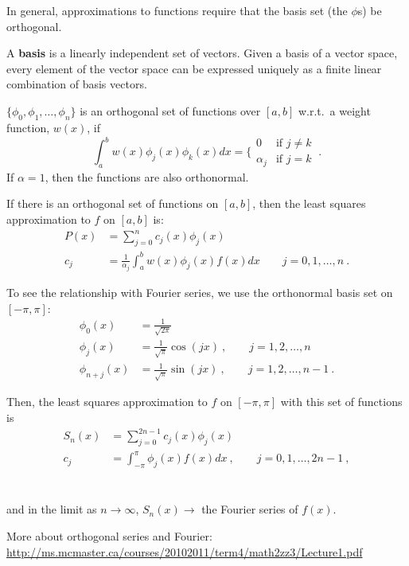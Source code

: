 \documentclass[12pt, answers]{exam}
\begin{document}
In general, approximations to functions require that the basis set (the $\phi$s) be orthogonal. 

A \textbf{basis} is a linearly independent set of vectors. Given a basis of a vector space, every element of the vector space can be expressed uniquely as a finite linear combination of basis vectors.

$\{ \phi_0, \phi_1, \dots, \phi_n\}$ is an orthogonal set of functions over $[a,b]$ w.r.t.\ a weight function, $w(x)$, if
%
\begin{equation}
\int_a^b w(x) \phi_j(x) \phi_k(x) dx = \biggl\{
\begin{array}{ll}
0 & \mbox{if } j \neq k \\
\alpha_j & \mbox{if } j = k
\end{array}\:. \nonumber
\end{equation}
%
If $\alpha = 1$, then the functions are also orthonormal.

If there is an orthogonal set of functions on $[a,b]$, then the least squares approximation to $f$ on $[a,b]$ is:
\begin{align*}
P(x) &= \sum_{j=0}^n c_j(x) \phi_j(x) \\
c_j &= \frac{1}{\alpha_j} \int_a^b w(x)\phi_j(x)f(x)dx \qquad j=0, 1, \dots, n\:.
\end{align*}

To see the relationship with Fourier series, we use the orthonormal basis set on $[-\pi, \pi]$:
%
\begin{align*}
\phi_0(x) &= \frac{1}{\sqrt{2\pi}} \\
\phi_j(x) &= \frac{1}{\sqrt{\pi}}\cos(jx)\:, \qquad j=1,2,\dots,n \\
\phi_{n+j}(x) &= \frac{1}{\sqrt{\pi}}\sin(jx)\:, \qquad j=1,2,\dots,n-1 \:.
\end{align*}

Then, the least squares approximation to $f$ on $[-\pi,\pi]$ with this set of functions is
%
\ifprintanswers
\begin{align*}
S_n(x) &= \sum_{j=0}^{2n-1} c_j(x) \phi_j(x) \\
c_j &= \int_{-\pi}^{\pi} \phi_j(x)f(x)dx \:, \qquad j=0, 1, \dots, 2n-1 \:,
\end{align*}
\else
\\\vspace*{5em}\\
\fi
%
and in the limit as $n \rightarrow \infty$, $S_n(x) \rightarrow$ the Fourier series of $f(x)$.  

More about orthogonal series and Fourier:\\ \href{http://ms.mcmaster.ca/courses/20102011/term4/math2zz3/Lecture1.pdf}{http://ms.mcmaster.ca/courses/20102011/term4/math2zz3/Lecture1.pdf}


%
% 
\end{document}
